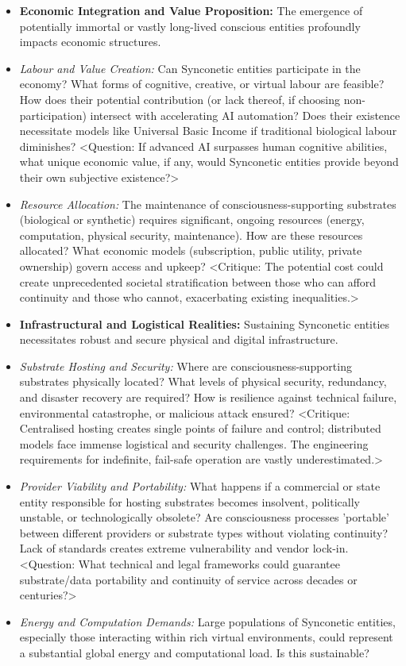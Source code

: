 \documentclass[10pt]{article}
\begin{document}
\begin{sloppypar}
\begin{itemize}
    \item \textbf{Economic Integration and Value Proposition:} The emergence of potentially immortal or vastly long-lived conscious entities profoundly impacts economic structures.
    \item \textit{Labour and Value Creation:} Can Synconetic entities participate in the economy? What forms of cognitive, creative, or virtual labour are feasible? How does their potential contribution (or lack thereof, if choosing non-participation) intersect with accelerating AI automation? Does their existence necessitate models like Universal Basic Income if traditional biological labour diminishes? <Question: If advanced AI surpasses human cognitive abilities, what unique economic value, if any, would Synconetic entities provide beyond their own subjective existence?>
    \item \textit{Resource Allocation:} The maintenance of consciousness-supporting substrates (biological or synthetic) requires significant, ongoing resources (energy, computation, physical security, maintenance). How are these resources allocated? What economic models (subscription, public utility, private ownership) govern access and upkeep? <Critique: The potential cost could create unprecedented societal stratification between those who can afford continuity and those who cannot, exacerbating existing inequalities.>

    \item \textbf{Infrastructural and Logistical Realities:} Sustaining Synconetic entities necessitates robust and secure physical and digital infrastructure.
    \item \textit{Substrate Hosting and Security:} Where are consciousness-supporting substrates physically located? What levels of physical security, redundancy, and disaster recovery are required? How is resilience against technical failure, environmental catastrophe, or malicious attack ensured? <Critique: Centralised hosting creates single points of failure and control; distributed models face immense logistical and security challenges. The engineering requirements for indefinite, fail-safe operation are vastly underestimated.>
    \item \textit{Provider Viability and Portability:} What happens if a commercial or state entity responsible for hosting substrates becomes insolvent, politically unstable, or technologically obsolete? Are consciousness processes 'portable' between different providers or substrate types without violating continuity? Lack of standards creates extreme vulnerability and vendor lock-in. <Question: What technical and legal frameworks could guarantee substrate/data portability and continuity of service across decades or centuries?>
    \item \textit{Energy and Computation Demands:} Large populations of Synconetic entities, especially those interacting within rich virtual environments, could represent a substantial global energy and computational load. Is this sustainable?


\end{itemize}
\end{sloppypar}
\end{document}
